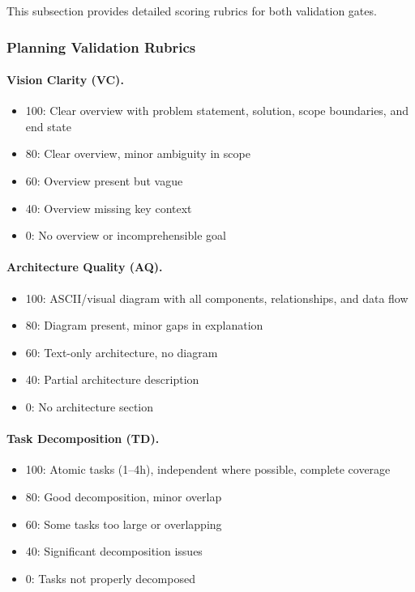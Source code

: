This subsection provides detailed scoring rubrics for both validation gates.

\subsubsection{Planning Validation Rubrics}

\paragraph{Vision Clarity (VC).}
\begin{itemize}
    \item 100: Clear overview with problem statement, solution, scope boundaries,
    and end state
    \item 80: Clear overview, minor ambiguity in scope
    \item 60: Overview present but vague
    \item 40: Overview missing key context
    \item 0: No overview or incomprehensible goal
\end{itemize}

\paragraph{Architecture Quality (AQ).}
\begin{itemize}
    \item 100: ASCII/visual diagram with all components, relationships, and data flow
    \item 80: Diagram present, minor gaps in explanation
    \item 60: Text-only architecture, no diagram
    \item 40: Partial architecture description
    \item 0: No architecture section
\end{itemize}

\paragraph{Task Decomposition (TD).}
\begin{itemize}
    \item 100: Atomic tasks (1--4h), independent where possible, complete coverage
    \item 80: Good decomposition, minor overlap
    \item 60: Some tasks too large or overlapping
    \item 40: Significant decomposition issues
    \item 0: Tasks not properly decomposed
\end{itemize}

